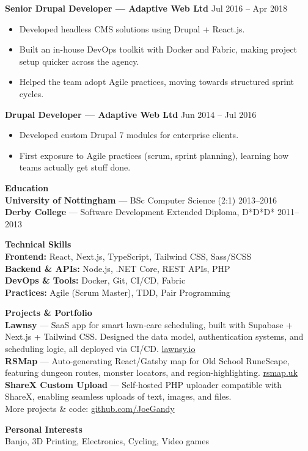 \documentclass[11pt,a4paper]{article}
\newcommand{\cvsection}[1]{\vspace{0.8em}\noindent\large\textbf{#1}\vspace{0.4em}\\}
\begin{document}
\textbf{Senior Drupal Developer --- Adaptive Web Ltd} \hfill Jul 2016 -- Apr 2018
\begin{itemize}
  \item Developed headless CMS solutions using Drupal + React.js.
  \item Built an in-house DevOps toolkit with Docker and Fabric, making project setup quicker across the agency.
  \item Helped the team adopt Agile practices, moving towards structured sprint cycles.
\end{itemize}

\textbf{Drupal Developer --- Adaptive Web Ltd} \hfill Jun 2014 -- Jul 2016
\begin{itemize}
  \item Developed custom Drupal 7 modules for enterprise clients.
  \item First exposure to Agile practices (scrum, sprint planning), learning how teams actually get stuff done.
\end{itemize}

\cvsection{Education}
\textbf{University of Nottingham} --- BSc Computer Science (2:1) \hfill 2013--2016 \\
\textbf{Derby College} --- Software Development Extended Diploma, D*D*D* \hfill 2011--2013

\cvsection{Technical Skills}
\textbf{Frontend:} React, Next.js, TypeScript, Tailwind CSS, Sass/SCSS \\
\textbf{Backend \& APIs:} Node.js, .NET Core, REST APIs, PHP \\
\textbf{DevOps \& Tools:} Docker, Git, CI/CD, Fabric \\
\textbf{Practices:} Agile (Scrum Master), TDD, Pair Programming

\cvsection{Projects \& Portfolio}
\textbf{Lawnsy} --- SaaS app for smart lawn-care scheduling, built with Supabase + Next.js + Tailwind CSS. Designed the data model, authentication systems, and scheduling logic, all deployed via CI/CD. \href{https://lawnsy.io}{lawnsy.io} \\
\textbf{RSMap} --- Auto-generating React/Gatsby map for Old School RuneScape, featuring dungeon routes, monster locators, and region-highlighting. \href{https://rsmap.uk}{rsmap.uk} \\
\textbf{ShareX Custom Upload} --- Self-hosted PHP uploader compatible with ShareX, enabling seamless uploads of text, images, and files. \\
More projects \& code: \href{https://github.com/JoeGandy}{github.com/JoeGandy}

\cvsection{Personal Interests}
Banjo, 3D Printing, Electronics, Cycling, Video games
\end{document}
